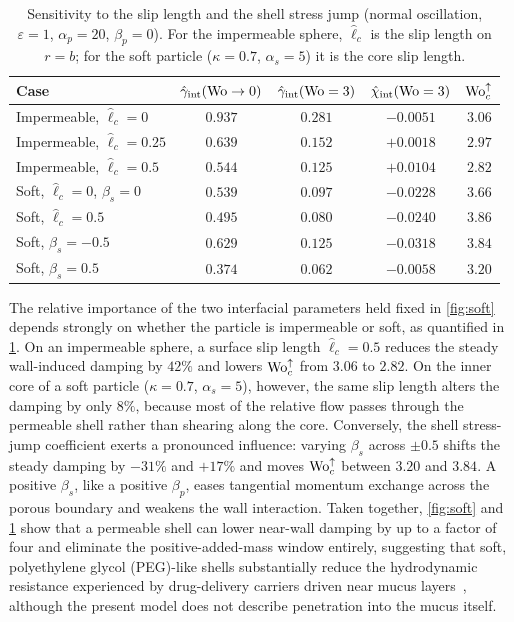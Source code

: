 \begin{table}[t]
\caption{Sensitivity to the slip length and the shell stress jump (normal oscillation, $\varepsilon=1$, $\alpha_p=20$,
$\beta_p=0$). For the impermeable sphere, $\hat\ell_c$ is the slip length on $r=b$; for the soft particle
($\kappa=0.7$, $\alpha_s=5$) it is the core slip length.}
\label{tab:sensitivity}
\begin{ruledtabular}
\begin{tabular}{lcccc}
Case & $\hat\gamma_{\rm int}(\mathrm{Wo}\to0)$ & $\hat\gamma_{\rm int}(\mathrm{Wo}=3)$ & $\hat\chi_{\rm int}(\mathrm{Wo}=3)$ & $\mathrm{Wo}_c^{\uparrow}$\\
\hline
Impermeable, $\hat\ell_c=0$ & $0.937$ & $0.281$ & $-0.0051$ & $3.06$\\
Impermeable, $\hat\ell_c=0.25$ & $0.639$ & $0.152$ & $+0.0018$ & $2.97$\\
Impermeable, $\hat\ell_c=0.5$ & $0.544$ & $0.125$ & $+0.0104$ & $2.82$\\
Soft, $\hat\ell_c=0$, $\beta_s=0$ & $0.539$ & $0.097$ & $-0.0228$ & $3.66$\\
Soft, $\hat\ell_c=0.5$ & $0.495$ & $0.080$ & $-0.0240$ & $3.86$\\
Soft, $\beta_s=-0.5$ & $0.629$ & $0.125$ & $-0.0318$ & $3.84$\\
Soft, $\beta_s=0.5$ & $0.374$ & $0.062$ & $-0.0058$ & $3.20$\\
\end{tabular}
\end{ruledtabular}
\end{table}

The relative importance of the two interfacial parameters held fixed in \cref{fig:soft} depends strongly on whether the
particle is impermeable or soft, as quantified in \cref{tab:sensitivity}. On an impermeable sphere, a surface slip length
$\hat\ell_c=0.5$ reduces the steady wall-induced damping by $42\%$ and lowers $\mathrm{Wo}_c^{\uparrow}$ from $3.06$ to $2.82$. On
the inner core of a soft particle ($\kappa=0.7$, $\alpha_s=5$), however, the same slip length alters the damping by only
$8\%$, because most of the relative flow passes through the permeable shell rather than shearing along the core.
Conversely, the shell stress-jump coefficient exerts a pronounced influence: varying $\beta_s$ across $\pm0.5$ shifts the
steady damping by $-31\%$ and $+17\%$ and moves $\mathrm{Wo}_c^{\uparrow}$ between $3.20$ and $3.84$. A positive $\beta_s$, like a
positive $\beta_p$, eases tangential momentum exchange across the porous boundary and weakens the wall interaction. Taken
together, \cref{fig:soft} and \cref{tab:sensitivity} show that a permeable shell can lower near-wall damping by up to a
factor of four and eliminate the positive-added-mass window entirely, suggesting that soft, polyethylene glycol
(PEG)-like shells substantially reduce the hydrodynamic resistance experienced by drug-delivery carriers driven near mucus
layers~\cite{pangeni2023airway}, although the present model does not describe penetration into the mucus itself.

